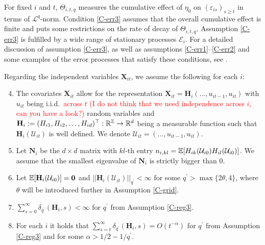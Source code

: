 \documentclass[a4paper,12pt]{article}
\begin{document}
For fixed $i$ and $t$, $\Theta_{i, t,q}$ measures the cumulative effect of $\eta_0$ on $(\varepsilon_{is})_{s\geq t}$ in terms of $\mathcal{L}^q$-norm. Condition \ref{C-err3} assumes that the overall cumulative effect is finite and puts some restrictions on the rate of decay of $\Theta_{i, t,q}$. Assumption \ref{C-err3} is fulfilled by a wide range of stationary processes $\mathcal{E}_i$. For a detailed discussion of assumption \ref{C-err3}, as well as assumptions \ref{C-err1}--\ref{C-err2} and some examples of the error processes that satisfy these conditions, see \cite{KhismatullinaVogt2020}.

Regarding the independent variables $ \mathbf{X}_{it}$, we assume the following for each $i$:

\begin{enumerate}[label=(C\arabic*),leftmargin=1.05cm]
\setcounter{enumi}{3}

\item \label{C-reg1} The covariates $ \mathbf{X}_{it}$ allow for the representation $ \mathbf{X}_{it} = \mathbf{H}_i(\ldots,u_{it-1},u_{it})$ with $u_{it}$ being i.i.d.\  \textcolor{red} {across $t$ (I do not think that we need independence across $i$, can you have a look?)} random variables and $\mathbf{H}_i := (H_{i1}, H_{i2}, \ldots, H_{id})^\top: \mathbb{R}^{\mathbb{Z}} \rightarrow \mathbb{R}^d$ being a measurable function such that $\mathbf{H}_i(\mathcal{U}_{it})$ is well defined. We denote \linebreak $\mathcal{U}_{it} = (\ldots, u_{it-1}, u_{it})$.

\item \label{C-reg2} Let $\mathbf{N}_i$ be the $d\times d$ matrix with $kl$-th entry $n_{i, kl}= \mathbb{E}[H_{ik}(\mathcal{U}_{i0})H_{il}(\mathcal{U}_{i0})]$. We assume that the smallest eigenvalue of $\mathbf{N}_i$ is strictly bigger than $0$.

\item \label{C-reg3} Let $\mathbb{E} [\mathbf{H}_{i}(\mathcal{U}_{i0})]=\mathbf{0}$ and $||\mathbf{H}_{i}(\mathcal{U}_{it})||_{q^\prime} <\infty$ for some $q^\prime > \max\{ 2\theta, 4\}$, where $\theta$ will be introduced further in Assumption \ref{C-grid}.
\item \label{C-reg4} $\sum_{s=0}^\infty \delta_{q^\prime}(\mathbf{H}_i, s)<\infty$ for $q^\prime$ from Assumption \ref{C-reg3}.
\item \label{C-reg5} For each $i$ it holds that $\sum_{s=t}^{\infty} \delta_{q^\prime}(\mathbf{H}_{i}, s)= O(t^{-\alpha}) $ for $q^\prime$ from Assumption \ref{C-reg3} and for some $\alpha > 1/2 - 1/{q^\prime}$.
\end{enumerate}
\end{document}
